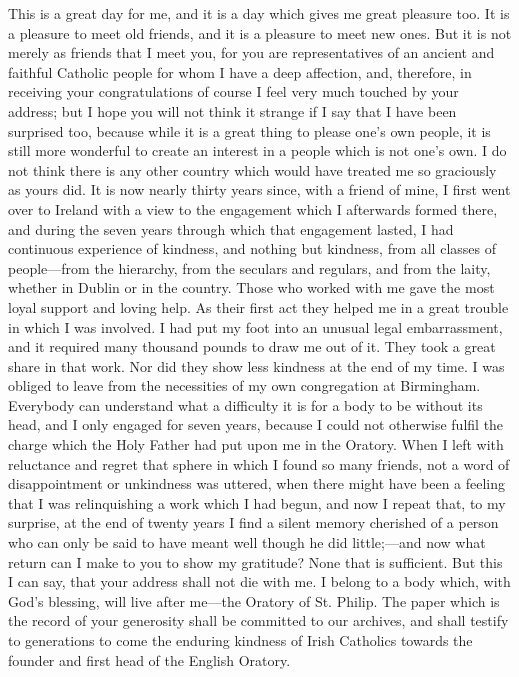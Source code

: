 This is a great day for me, and it is a day which gives me great
pleasure too. It is a pleasure to meet old friends, and it is a
pleasure to meet new ones. But it is not merely as friends that I
meet you, for you are representatives of an ancient and faithful
Catholic people for whom I have a deep affection, and, therefore, in
receiving your congratulations of course I feel very much touched by
your address; but I hope you will not think it strange if I say that I
have been surprised too, because while it is a great thing to please
one's own people, it is still more wonderful to create an interest in
a people which is not one's own. I do not think there is any other
country which would have treated me so graciously as yours did. It is
now nearly thirty years since, with a friend of mine, I first went
over to Ireland with a view to the engagement which I afterwards
formed there, and during the seven years through which that engagement
lasted, I had continuous experience of kindness, and nothing but
kindness, from all classes of people—from the hierarchy, from the
seculars and regulars, and from the laity, whether in Dublin or in the
country. Those who worked with me gave the most loyal support and
loving help. As their first act they helped me in a great trouble in
which I was involved. I had put my foot into an unusual legal
embarrassment, and it required many thousand pounds to draw me out of
it. They took a great share in that work. Nor did they show less
kindness at the end of my time. I was obliged to leave from the
necessities of my own congregation at Birmingham. Everybody can
understand what a difficulty it is for a body to be without its head,
and I only engaged for seven years, because I could not otherwise
fulfil the charge which the Holy Father had put upon me in the
Oratory. When I left with reluctance and regret that sphere in which I
found so many friends, not a word of disappointment or unkindness was
uttered, when there might have been a feeling that I was relinquishing
a work which I had begun, and now I repeat that, to my surprise, at
the end of twenty years I find a silent memory cherished of a person
who can only be said to have meant well though he did little;—and
now what return can I make to you to show my gratitude? None that is
sufficient. But this I can say, that your address shall not die with
me. I belong to a body which, with God's blessing, will live
after me—the Oratory of St. Philip. The paper which is the record of
your generosity shall be committed to our archives, and shall testify
to generations to come the enduring kindness of Irish Catholics
towards the founder and first head of the English Oratory.


